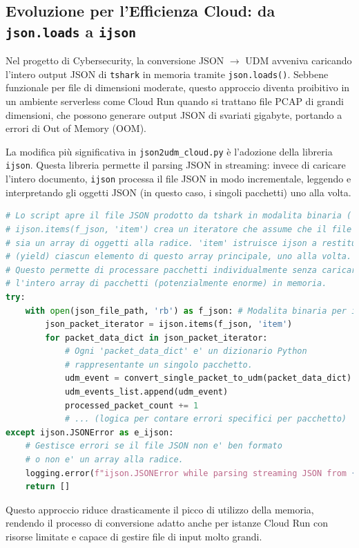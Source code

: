 \documentclass[11pt, a4paper]{article}
\begin{document}
\subsection{Evoluzione per l'Efficienza Cloud: da \texttt{json.loads} a \texttt{ijson}}
Nel progetto di Cybersecurity, la conversione JSON $\rightarrow$ UDM avveniva caricando l'intero output JSON di \texttt{tshark} in memoria tramite \texttt{json.loads()}. Sebbene funzionale per file di dimensioni moderate, questo approccio diventa proibitivo in un ambiente serverless come Cloud Run quando si trattano file PCAP di grandi dimensioni, che possono generare output JSON di svariati gigabyte, portando a errori di Out of Memory (OOM).

La modifica più significativa in \texttt{json2udm\_cloud.py} è l'adozione della libreria \texttt{ijson}. Questa libreria permette il parsing JSON in streaming: invece di caricare l'intero documento, \texttt{ijson} processa il file JSON in modo incrementale, leggendo e interpretando gli oggetti JSON (in questo caso, i singoli pacchetti) uno alla volta.

\begin{lstlisting}[language=Python, caption={Estratto da \texttt{json2udm\_cloud.py}: Utilizzo di \texttt{ijson} per lo streaming.}, label=lst:ijson_streaming, basicstyle=\ttfamily\scriptsize]
# Lo script apre il file JSON prodotto da tshark in modalita binaria ('rb').
# ijson.items(f_json, 'item') crea un iteratore che assume che il file JSON
# sia un array di oggetti alla radice. 'item' istruisce ijson a restituire
# (yield) ciascun elemento di questo array principale, uno alla volta.
# Questo permette di processare pacchetti individualmente senza caricare
# l'intero array di pacchetti (potenzialmente enorme) in memoria.
try:
    with open(json_file_path, 'rb') as f_json: # Modalita binaria per ijson
        json_packet_iterator = ijson.items(f_json, 'item') 
        for packet_data_dict in json_packet_iterator:
            # Ogni 'packet_data_dict' e' un dizionario Python
            # rappresentante un singolo pacchetto.
            udm_event = convert_single_packet_to_udm(packet_data_dict)
            udm_events_list.append(udm_event)
            processed_packet_count += 1
            # ... (logica per contare errori specifici per pacchetto)
except ijson.JSONError as e_ijson:
    # Gestisce errori se il file JSON non e' ben formato
    # o non e' un array alla radice.
    logging.error(f"ijson.JSONError while parsing streaming JSON from {json_file_path}: {e_ijson}...")
    return []
\end{lstlisting}
Questo approccio riduce drasticamente il picco di utilizzo della memoria, rendendo il processo di conversione adatto anche per istanze Cloud Run con risorse limitate e capace di gestire file di input molto grandi.
\end{document}
